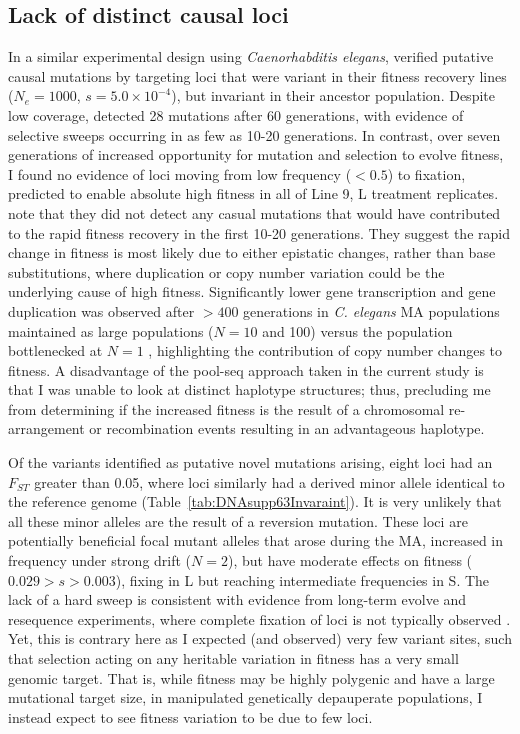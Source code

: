 \subsection{Lack of distinct causal loci}
In a similar experimental design using \textit{Caenorhabditis elegans}, \citet{Denv10} verified putative causal mutations by targeting loci that were variant in their fitness recovery lines ($N_e = 1000$, $s = 5.0 \times 10^{-4}$), but invariant in their ancestor population. Despite low coverage, \citet{Denv10} detected 28 mutations after 60 generations, with evidence of selective sweeps occurring in as few as 10-20 generations. In contrast, over seven generations of increased opportunity for mutation and selection to evolve fitness, I found no evidence of loci moving from low frequency ($<0.5$) to fixation, predicted to enable absolute high fitness in all of Line 9, L treatment replicates. \citet{Denv10} note that they did not detect any casual mutations that would have contributed to the rapid fitness recovery in the first 10-20 generations. They suggest the rapid change in fitness is most likely due to either epistatic changes, rather than base substitutions, where duplication or copy number variation could be the underlying cause of high fitness. Significantly lower gene transcription and gene duplication was observed after $>400$ generations in \textit{C. elegans} MA populations maintained as large populations ($N = 10$ and 100) versus the population bottlenecked at $N = 1$ \citep{Konr18}, highlighting the contribution of copy number changes to fitness. A disadvantage of the pool-seq approach taken in the current study is that I was unable to look at distinct haplotype structures; thus, precluding me from determining if the increased fitness is the result of a chromosomal re-arrangement or recombination events resulting in an advantageous haplotype. \par

Of the variants identified as putative novel mutations arising, eight loci had an $F_{ST}$ greater than 0.05, where loci similarly had a derived minor allele identical to the reference genome (Table~\ref{tab:DNAsupp63Invaraint}). It is very unlikely that all these minor alleles are the result of a reversion mutation. These loci are potentially beneficial focal mutant alleles that arose during the MA, increased in frequency under strong drift ($N=2$), but have moderate effects on fitness ($0.029 > s > 0.003$), fixing in L but reaching intermediate frequencies in S. The lack of a hard sweep is consistent with evidence from long-term evolve and resequence experiments, where complete fixation of loci is not typically observed \citep{Burk12}. Yet, this is contrary here as I expected (and observed) very few variant sites, such that selection acting on any heritable variation in fitness has a very small genomic target. That is, while fitness may be highly polygenic and have a large mutational target size, in manipulated genetically depauperate populations, I instead expect to see fitness variation to be due to few loci. \par

